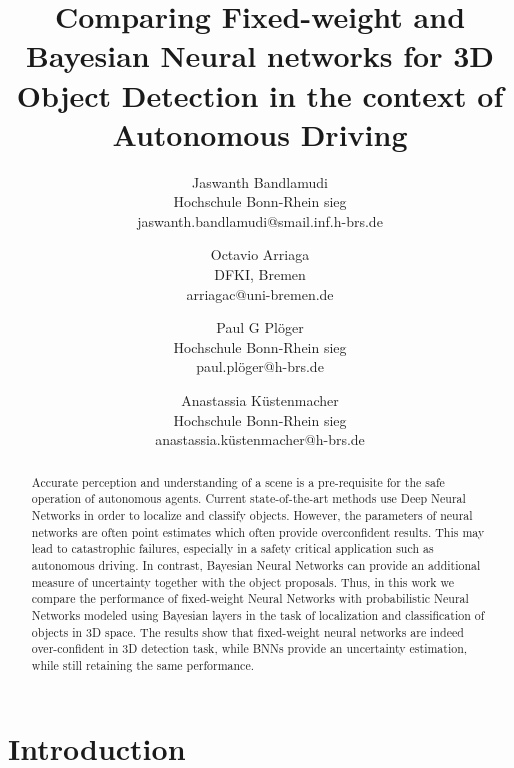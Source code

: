 \documentclass[10pt,twocolumn,letterpaper]{article}
\begin{document}
\title{Comparing Fixed-weight and Bayesian Neural networks for 3D Object Detection in the context of Autonomous Driving}

\author{Jaswanth Bandlamudi\\
Hochschule Bonn-Rhein sieg\\
jaswanth.bandlamudi@smail.inf.h-brs.de\\
\and 
Octavio Arriaga\\
DFKI, Bremen\\
arriagac@uni-bremen.de\\
\and
Paul G Pl\"{o}ger\\
Hochschule Bonn-Rhein sieg\\
paul.pl\"{o}ger@h-brs.de\\
\and
Anastassia K\"{u}stenmacher\\
Hochschule Bonn-Rhein sieg\\
anastassia.k\"{u}stenmacher@h-brs.de\\
}

\maketitle

\begin{abstract}
    Accurate perception and understanding of a scene is a pre-requisite for the safe operation of autonomous agents. Current state-of-the-art methods use Deep Neural Networks in order to localize and classify objects. However, the parameters of neural networks are often point estimates which often provide overconfident results. This may lead to catastrophic failures, especially in a safety critical application such as autonomous driving. In contrast, Bayesian Neural Networks  can provide an additional measure of uncertainty together with the object proposals. Thus, in this work we compare the performance of fixed-weight Neural Networks with probabilistic Neural Networks modeled using Bayesian layers in the task of localization and classification of objects in 3D space. The results show that fixed-weight neural networks are indeed over-confident in 3D detection task, while BNNs provide an uncertainty estimation, while still retaining the same performance.
\end{abstract}

\section{Introduction}
\end{document}

